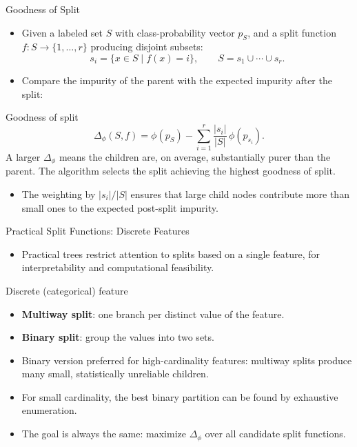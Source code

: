 \begin{frame}{Goodness of Split}
  \begin{itemize}
    \item Given a labeled set $S$ with class-probability vector $p_S$, and a split function
          $f: S \to \{1, \ldots, r\}$ producing disjoint subsets:
    \[
      s_i = \{x \in S \mid f(x) = i\}, \qquad S = s_1 \cup \cdots \cup s_r.
    \]
    \item Compare the impurity of the parent with the \alert{expected impurity after the split}:
  \end{itemize}
  \begin{block}{Goodness of split}
    \[
      \Delta_\phi(S, f) = \phi(p_S) - \sum_{i=1}^{r} \frac{|s_i|}{|S|}\,\phi(p_{s_i}).
    \]
    A \alert{larger} $\Delta_\phi$ means the children are, on average, substantially purer than
    the parent. The algorithm selects the split achieving the \alert{highest goodness of split}.
  \end{block}
  \begin{itemize}
    \item The weighting by $|s_i|/|S|$ ensures that \alert{large child nodes} contribute more than
          small ones to the expected post-split impurity.
  \end{itemize}
\end{frame}

\begin{frame}{Practical Split Functions: Discrete Features}
  \begin{itemize}
    \item Practical trees restrict attention to splits based on a \alert{single feature},
          for interpretability and computational feasibility.
  \end{itemize}
  \begin{block}{Discrete (categorical) feature}
    \begin{itemize}
      \item \textbf{Multiway split}: one branch per distinct value of the feature.
      \item \textbf{Binary split}: group the values into two sets.
      \item Binary version preferred for high-cardinality features: multiway splits
            produce many small, statistically unreliable children.
    \end{itemize}
  \end{block}
  \vspace{0.4em}
  \begin{itemize}
    \item For small cardinality, the best binary partition can be found by exhaustive enumeration.
    \item The goal is always the same: maximize $\Delta_\phi$ over all candidate split functions.
  \end{itemize}
\end{frame}

